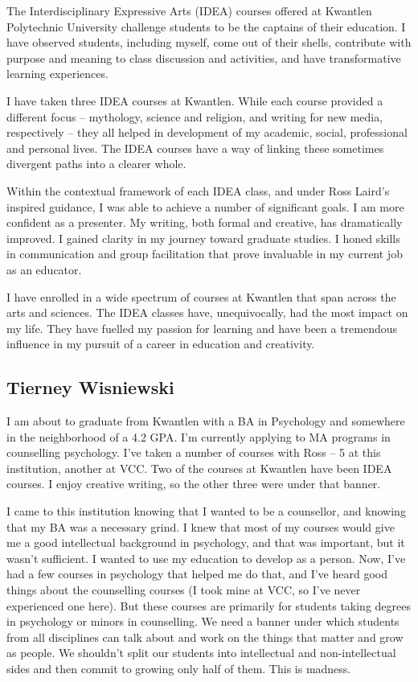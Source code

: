\documentclass[letterpaper,10pt,headsepline]{scrreprt}
\begin{document}
 The Interdisciplinary Expressive Arts (IDEA) courses offered at Kwantlen Polytechnic University challenge students to be the captains of their education. I have observed students, including myself, come out of their shells, contribute with purpose and meaning to class discussion and activities, and have transformative learning experiences.

I have taken three IDEA courses at Kwantlen. While each course provided a different focus -- mythology, science and religion, and writing for new media, respectively -- they all helped in development of my academic, social, professional and personal lives. The IDEA courses have a way of linking these sometimes divergent paths into a clearer whole.

Within the contextual framework of each IDEA class, and under Ross Laird's inspired guidance, I was able to achieve a number of significant goals. I am more confident as a presenter. My writing, both formal and creative, has dramatically improved. I gained clarity in my journey toward graduate studies. I honed skills in communication and group facilitation that prove invaluable in my current job as an educator.

I have enrolled in a wide spectrum of courses at Kwantlen that span across the arts and sciences. The IDEA classes have, unequivocally, had the most impact on my life. They have fuelled my passion for learning and have been a tremendous influence in my pursuit of a career in education and creativity.

\subsection{Tierney Wisniewski}

 I am about to graduate from Kwantlen with a BA in Psychology and somewhere in the neighborhood of a 4.2 GPA. I'm currently applying to MA programs in counselling psychology. I've taken a number of courses with Ross -- 5 at this institution, another at VCC. Two of the courses at Kwantlen have been IDEA courses. I enjoy creative writing, so the other three were under that banner.

I came to this institution knowing that I wanted to be a counsellor, and knowing that my BA was a necessary grind. I knew that most of my courses would give me a good intellectual background in psychology, and that was important, but it wasn't sufficient. I wanted to use my education to develop as a person. Now, I've had a few courses in psychology that helped me do that, and I've heard good things about the counselling courses (I took mine at VCC, so I've never experienced one here). But these courses are primarily for students taking degrees in psychology or minors in counselling. We need a banner under which students from all disciplines can talk about and work on the things that matter and grow as people. We shouldn't split our students into intellectual and non-intellectual sides and then commit to growing only half of them. This is madness.
\end{document}
